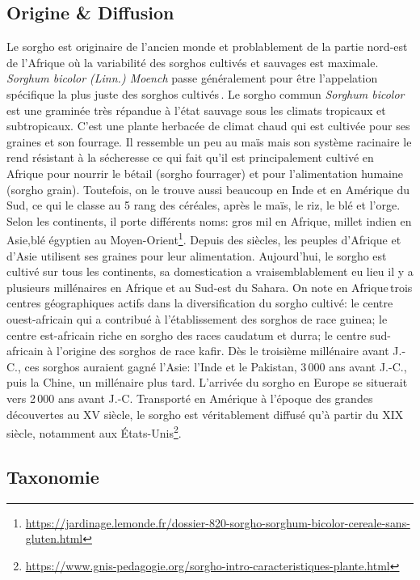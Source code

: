 \documentclass[a4paper,11pt]{article}
\begin{document}
  
\subsection{Origine \& Diffusion}

Le sorgho est originaire de l'ancien monde et problablement de la
partie nord-est de l'Afrique où la variabilité des sorghos cultivés et
sauvages est maximale. \emph{ Sorghum bicolor (Linn.) Moench} passe
généralement pour être l'appelation spécifique la plus juste des
sorghos cultivés\,\cite{food1977introduction}. Le sorgho commun
\emph{Sorghum bicolor} est une graminée très répandue à l'état sauvage
sous les climats tropicaux et subtropicaux. C'est une plante herbacée
de climat chaud qui est cultivée pour ses graines et son fourrage. Il
ressemble un peu au maïs mais son système racinaire le rend résistant
à la sécheresse ce qui fait qu'il est principalement cultivé en
Afrique pour nourrir le bétail (sorgho fourrager) et pour
l'alimentation humaine (sorgho grain). Toutefois, on le trouve aussi
beaucoup en Inde et en Amérique du Sud, ce qui le classe au 5\ieme{} rang
des céréales, après le maïs, le riz, le blé et l'orge. Selon les
continents, il porte différents noms: \og{}gros mil\fg{} en Afrique,
\og{}millet indien\fg{} en Asie,\og{}blé égyptien\fg{} au
Moyen-Orient\footnote{\url{https://jardinage.lemonde.fr/dossier-820-sorgho-sorghum-bicolor-cereale-sans-gluten.html}}. Depuis
des siècles, les peuples d'Afrique et d'Asie utilisent ses graines
pour leur alimentation. Aujourd'hui, le sorgho est cultivé sur tous
les continents, sa domestication a vraisemblablement eu lieu il y a
plusieurs millénaires en Afrique et au Sud-est du Sahara. On note en
Afrique\,trois centres géographiques actifs dans la diversification du
sorgho cultivé: le centre ouest-africain qui a contribué à
l'établissement des sorghos de race guinea; le centre est-africain
riche en sorgho des races caudatum et durra; le centre sud-africain à
l'origine des sorghos de race kafir. Dès le troisième millénaire avant
J.-C., ces sorghos auraient gagné l'Asie: l'Inde et le Pakistan,
3\,000 ans avant J.-C., puis la Chine, un millénaire plus
tard. L'arrivée du sorgho en Europe se situerait vers 2\,000 ans avant
J.-C. Transporté en Amérique à l'époque des grandes découvertes au
XV\ieme{} siècle, le sorgho est véritablement diffusé qu'à partir du
XIX\ieme{} siècle, notamment aux
États-Unis\footnote{\url{https://www.gnis-pedagogie.org/sorgho-intro-caracteristiques-plante.html}}.

\subsection{Taxonomie}
\end{document}

